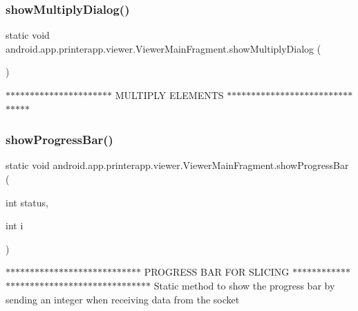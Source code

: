 \subsubsection{\texorpdfstring{show\+Multiply\+Dialog()}{showMultiplyDialog()}}
{\footnotesize\ttfamily static void android.\+app.\+printerapp.\+viewer.\+Viewer\+Main\+Fragment.\+show\+Multiply\+Dialog (\begin{DoxyParamCaption}{ }\end{DoxyParamCaption})\hspace{0.3cm}{\ttfamily [static]}}

$\ast$$\ast$$\ast$$\ast$$\ast$$\ast$$\ast$$\ast$$\ast$$\ast$$\ast$$\ast$$\ast$$\ast$$\ast$$\ast$$\ast$$\ast$$\ast$$\ast$$\ast$$\ast$ M\+U\+L\+T\+I\+P\+LY E\+L\+E\+M\+E\+N\+TS $\ast$$\ast$$\ast$$\ast$$\ast$$\ast$$\ast$$\ast$$\ast$$\ast$$\ast$$\ast$$\ast$$\ast$$\ast$$\ast$$\ast$$\ast$$\ast$$\ast$$\ast$$\ast$$\ast$$\ast$$\ast$$\ast$$\ast$$\ast$$\ast$$\ast$$\ast$ \mbox{\label{classandroid_1_1app_1_1printerapp_1_1viewer_1_1_viewer_main_fragment_a52f16ff69f6d64fb40c309f0df7eb734}} 
\subsubsection{\texorpdfstring{show\+Progress\+Bar()}{showProgressBar()}}
{\footnotesize\ttfamily static void android.\+app.\+printerapp.\+viewer.\+Viewer\+Main\+Fragment.\+show\+Progress\+Bar (\begin{DoxyParamCaption}\item[{int}]{status,  }\item[{int}]{i }\end{DoxyParamCaption})\hspace{0.3cm}{\ttfamily [static]}}

$\ast$$\ast$$\ast$$\ast$$\ast$$\ast$$\ast$$\ast$$\ast$$\ast$$\ast$$\ast$$\ast$$\ast$$\ast$$\ast$$\ast$$\ast$$\ast$$\ast$$\ast$$\ast$$\ast$$\ast$$\ast$$\ast$$\ast$$\ast$ P\+R\+O\+G\+R\+E\+SS B\+AR F\+OR S\+L\+I\+C\+I\+NG $\ast$$\ast$$\ast$$\ast$$\ast$$\ast$$\ast$$\ast$$\ast$$\ast$$\ast$$\ast$$\ast$$\ast$$\ast$$\ast$$\ast$$\ast$$\ast$$\ast$$\ast$$\ast$$\ast$$\ast$$\ast$$\ast$$\ast$$\ast$$\ast$$\ast$$\ast$$\ast$$\ast$$\ast$$\ast$$\ast$$\ast$$\ast$$\ast$$\ast$$\ast$$\ast$ Static method to show the progress bar by sending an integer when receiving data from the socket


